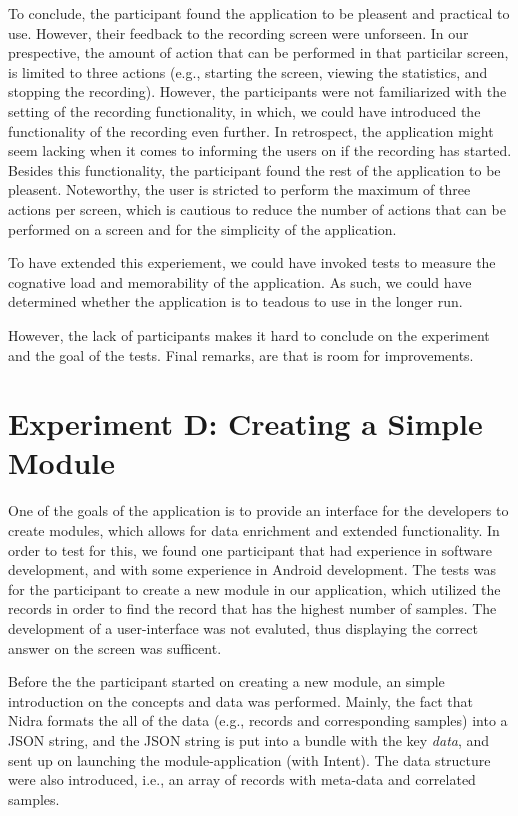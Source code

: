 To conclude, the participant found the application to be pleasent and practical to use. However, their feedback to the recording screen were unforseen. In our prespective, the amount of action that can be performed in that particilar screen, is limited to three actions (e.g., starting the screen, viewing the statistics, and stopping the recording). However, the participants were not familiarized with the setting of the recording functionality, in which, we could have introduced the functionality of the recording even further. In retrospect, the application might seem lacking when it comes to informing the users on if the recording has started. Besides this functionality, the participant found the rest of the application to be pleasent. Noteworthy, the user is stricted to perform the maximum of three actions per screen, which is cautious to reduce the number of actions that can be performed on a screen and for the simplicity of the application. 

To have extended this experiement, we could have invoked tests to measure the cognative load and memorability of the application. As such, we could have determined whether the application is to teadous to use in the longer run. 

However, the lack of participants makes it hard to conclude on the experiment and the goal of the tests. Final remarks, are that is room for improvements.

\section{Experiment D: Creating a Simple Module}
One of the goals of the application is to provide an interface for the developers to create modules, which allows for data enrichment and extended functionality. In order to test for this, we found one participant that had experience in software development, and with some experience in Android development. The tests was for the participant to create a new module in our application, which utilized the records in order to find the record that has the highest number of samples. The development of a user-interface was not evaluted, thus displaying the correct answer on the screen was sufficent. 

Before the the participant started on creating a new module, an simple introduction on the concepts and data was performed. Mainly, the fact that Nidra formats the all of the data (e.g., records and corresponding samples) into a JSON string, and the JSON string is put into a bundle with the key \textit{data}, and sent up on launching the module-application (with Intent). The data structure were also introduced, i.e., an array of records with meta-data and correlated samples.

